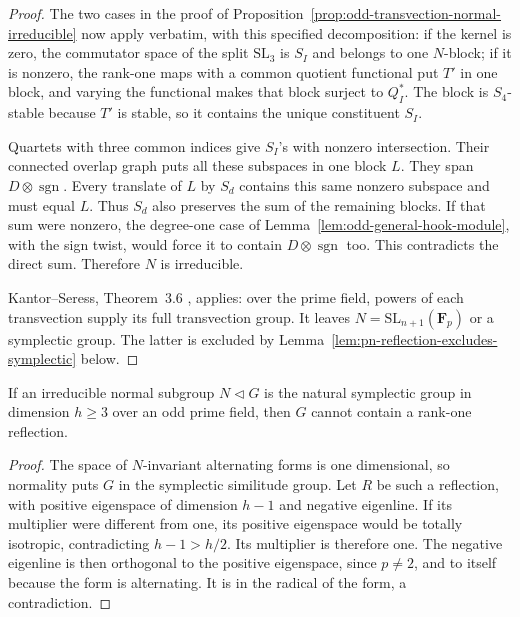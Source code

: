 \begin{proof}
The two cases in the proof of
Proposition~\ref{prop:odd-transvection-normal-irreducible} now
apply verbatim, with this specified decomposition: if the kernel
is zero, the commutator space of the split $\mathrm{SL}_3$ is
$S_I$ and belongs to one $N$-block; if it is nonzero, the
rank-one maps with a common quotient functional put $T'$ in one
block, and varying the functional makes that block surject to
$Q_I^*$.  The block is $S_4$-stable because $T'$ is stable, so
it contains the unique constituent $S_I$.

Quartets with three common indices give $S_I$'s with nonzero
intersection.  Their connected overlap graph puts all these
subspaces in one block $L$.  They span
$D\otimes\operatorname{sgn}$.  Every translate of $L$ by $S_d$
contains this same nonzero subspace and must equal $L$.
Thus $S_d$ also preserves the sum of the remaining blocks.
If that sum were nonzero, the degree-one case of
Lemma~\ref{lem:odd-general-hook-module}, with the sign twist,
would force it to contain $D\otimes\operatorname{sgn}$ too.
This contradicts the direct sum.  Therefore $N$ is irreducible.

Kantor--Seress, Theorem~3.6 \cite{KantorSeress2001}, applies:
over the prime field, powers of each transvection supply its
full transvection group.  It leaves
$N=\mathrm{SL}_{n+1}(\mathbf F_p)$ or a symplectic group.
The latter is excluded by
Lemma~\ref{lem:pn-reflection-excludes-symplectic} below.
\end{proof}

\begin{lemma}\label{lem:pn-reflection-excludes-symplectic}
If an irreducible normal subgroup $N\triangleleft G$ is the
natural symplectic group in dimension $h\geq3$ over an odd prime
field, then $G$ cannot contain a rank-one reflection.
\end{lemma}

\begin{proof}
The space of $N$-invariant alternating forms is one dimensional,
so normality puts $G$ in the symplectic similitude group.
Let $R$ be such a reflection, with positive eigenspace of
dimension $h-1$ and negative eigenline.  If its multiplier
were different from one, its positive eigenspace would be
totally isotropic, contradicting $h-1>h/2$.
Its multiplier is therefore one.  The negative eigenline is
then orthogonal to the positive eigenspace, since $p\ne2$,
and to itself because the form is alternating.  It is in the
radical of the form, a contradiction.
\end{proof}

